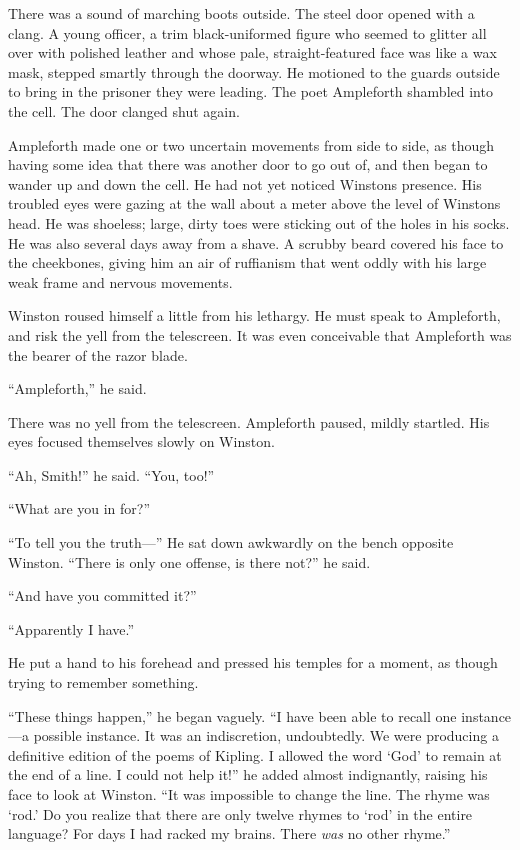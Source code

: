 There was a sound of marching boots outside. The steel door opened with
a clang. A young officer, a trim black-uniformed figure who seemed to
glitter all over with polished leather and whose pale, straight-featured
face was like a wax mask, stepped smartly through the doorway. He
motioned to the guards outside to bring in the prisoner they were
leading. The poet Ampleforth shambled into the cell. The door clanged
shut again.

Ampleforth made one or two uncertain movements from side to side, as
though having some idea that there was another door to go out of, and
then began to wander up and down the cell. He had not yet noticed
Winston\textquotesingle s presence. His troubled eyes were gazing at the
wall about a meter above the level of Winston\textquotesingle s head. He
was shoeless; large, dirty toes were sticking out of the holes in his
socks. He was also several days away from a shave. A scrubby beard
covered his face to the cheekbones, giving him an air of ruffianism that
went oddly with his large weak frame and nervous movements.

Winston roused himself a little from his lethargy. He must speak to
Ampleforth, and risk the yell from the telescreen. It was even
conceivable that Ampleforth was the bearer of the razor blade.

``Ampleforth,'' he said.

There was no yell from the telescreen. Ampleforth paused, mildly
startled. His eyes focused themselves slowly on Winston.

``Ah, Smith!'' he said. ``You, too!''

``What are you in for?''

``To tell you the truth---'' He sat down awkwardly on the bench opposite
Winston. ``There is only one offense, is there not?'' he said.

``And have you committed it?''

``Apparently I have.''

He put a hand to his forehead and pressed his temples for a moment, as
though trying to remember something.

``These things happen,'' he began vaguely. ``I have been able to recall one
instance---a possible instance. It was an indiscretion, undoubtedly. We were
producing a definitive edition of the poems of Kipling. I allowed the word
`God' to remain at the end of a line. I could not help it!'' he added almost
indignantly, raising his face to look at Winston. ``It was impossible to
change the line. The rhyme was `rod.' Do you realize that there are only
twelve rhymes to `rod' in the entire language? For days I had racked my
brains. There \emph{was} no other rhyme.''

